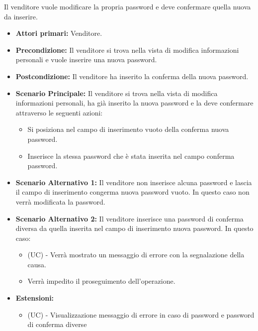 Il venditore vuole modificare la propria password e deve confermare quella nuova da inserire.
\begin{itemize}
    \item \textbf{Attori primari:} Venditore.
    \item \textbf{Precondizione:} Il venditore si trova nella vista di modifica informazioni personali e vuole inserire una nuova password.
    \item \textbf{Postcondizione:} Il venditore ha inserito la conferma della nuova password.
    \item \textbf{Scenario Principale:} Il venditore si trova nella vista di modifica informazioni personali, ha già inserito la nuova password e la deve confermare attraverso le seguenti azioni:
        \begin{itemize}
            \item Si posiziona nel campo di inserimento vuoto della conferma nuova password.
            \item Inserisce la stessa password che è stata inserita nel campo conferma password.
        \end{itemize}
    \item \textbf{Scenario Alternativo 1:} Il venditore non inserisce alcuna password e lascia il campo di inserimento congerma nuova password vuoto. In questo caso non verrà modificata la password.
    \item \textbf{Scenario Alternativo 2:} Il venditore inserisce una password di conferma diversa da quella inserita nel campo di inserimento nuova password. In questo caso:
    \begin{itemize}
        \item (UC) - Verrà mostrato un messaggio di errore con la segnalazione della causa.
        \item Verrà impedito il proseguimento dell'operazione.
    \end{itemize}
    \item \textbf{Estensioni:}
    \begin{itemize}
        \item (UC) - Visualizzazione messaggio di errore in caso di password e password di conferma diverse
    \end{itemize}
\end{itemize}

